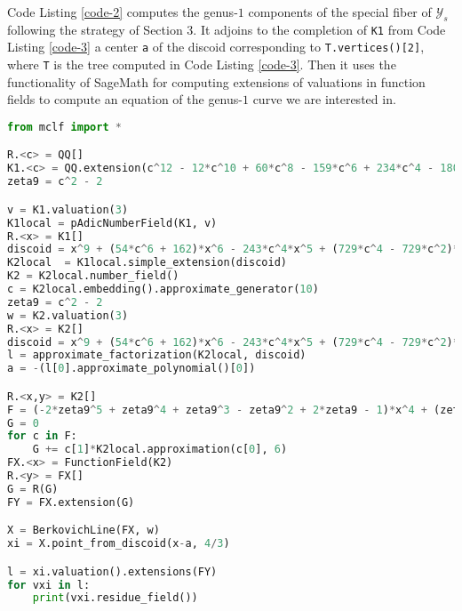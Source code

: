 \documentclass[11pt]{amsart}
\newcommand{\CY}{{\mathcal Y}}
\theoremstyle{definition}
\begin{document}
Code Listing \ref{code-2} computes the genus-$1$ components of the special fiber of $\CY_s$ following the strategy of Section 3. It adjoins to the completion of \texttt{K1} from Code Listing \ref{code-3} a center \texttt{a} of the discoid corresponding to \texttt{T.vertices()[2]}, where \texttt{T} is the tree computed in Code Listing \ref{code-3}. Then it uses the functionality of SageMath for computing extensions of valuations in function fields to compute an equation of the genus-$1$ curve we are interested in.

\begin{lstlisting}[language=Python, label = {code-2}, caption=SageMath program. Uses the functionality of Sage to compute another special fiber]
from mclf import *

R.<c> = QQ[]
K1.<c> = QQ.extension(c^12 - 12*c^10 + 60*c^8 - 159*c^6 + 234*c^4 - 180*c^2 + 57)
zeta9 = c^2 - 2

v = K1.valuation(3)
K1local = pAdicNumberField(K1, v)
R.<x> = K1[]
discoid = x^9 + (54*c^6 + 162)*x^6 - 243*c^4*x^5 + (729*c^4 - 729*c^2)*x^4 + (729*c^8 - 729*c^6 + 2187*c^4 + 3645*c^2 - 2187)*x^3 + (4374*c^10 + 13122*c^6 + 13122*c^4 + 13122*c^2 + 13122)*x^2 + (13122*c^10 + 6561/2*c^8 + 39366*c^4)*x + 6561*c^10 - 13122*c^8 + 15309/2*c^6 + 52488*c^4 + 6561/5*c^2
K2local  = K1local.simple_extension(discoid)
K2 = K2local.number_field()
c = K2local.embedding().approximate_generator(10)
zeta9 = c^2 - 2
w = K2.valuation(3)
R.<x> = K2[]
discoid = x^9 + (54*c^6 + 162)*x^6 - 243*c^4*x^5 + (729*c^4 - 729*c^2)*x^4 + (729*c^8 - 729*c^6 + 2187*c^4 + 3645*c^2 - 2187)*x^3 + (4374*c^10 + 13122*c^6 + 13122*c^4 + 13122*c^2 + 13122)*x^2 + (13122*c^10 + 6561/2*c^8 + 39366*c^4)*x + 6561*c^10 - 13122*c^8 + 15309/2*c^6 + 52488*c^4 + 6561/5*c^2
l = approximate_factorization(K2local, discoid)
a = -(l[0].approximate_polynomial()[0])

R.<x,y> = K2[]
F = (-2*zeta9^5 + zeta9^4 + zeta9^3 - zeta9^2 + 2*zeta9 - 1)*x^4 + (zeta9^5 + zeta9^3 + zeta9^2)*x^3*y + (24*zeta9^5 - 6*zeta9^4 + 15*zeta9^3 + 12*zeta9^2 + 15)*x^3 + (9*zeta9^4)*x^2*y + y^3 + (-45*zeta9^5 + 9*zeta9^4 - 18*zeta9^3 + 45*zeta9^2 - 63*zeta9 - 36)*x^2 + (9*zeta9^5 - 27*zeta9^4 - 18*zeta9^3 + 18*zeta9^2 - 36)*x*y + (135*zeta9^5 + 135*zeta9^4 - 135*zeta9^3 - 54*zeta9^2 + 270*zeta9 - 27)*x + (9*zeta9^5 + 54*zeta9^4 + 18*zeta9^3 - 36*zeta9^2 + 27*zeta9 + 63)*y + (-189*zeta9^5 - 81*zeta9^4 + 279*zeta9^3 - 108*zeta9^2 - 270*zeta9 + 72)
G = 0
for c in F:
	G += c[1]*K2local.approximation(c[0], 6)
FX.<x> = FunctionField(K2)
R.<y> = FX[]
G = R(G)
FY = FX.extension(G)

X = BerkovichLine(FX, w)
xi = X.point_from_discoid(x-a, 4/3)

l = xi.valuation().extensions(FY)
for vxi in l:
	print(vxi.residue_field())

\end{lstlisting}



\printbibliography
\end{document}
